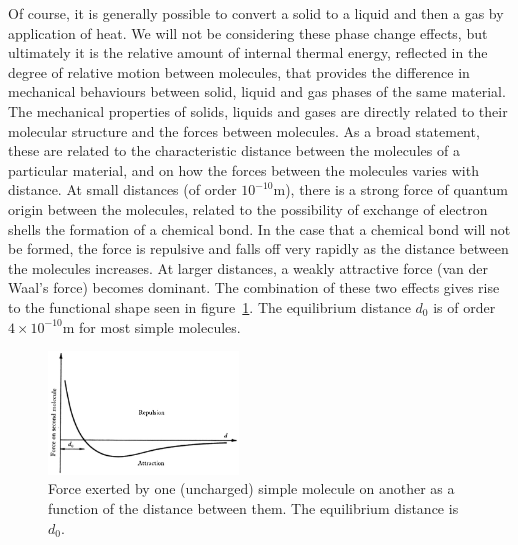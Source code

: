 \documentclass[twoside,11pt]		{report}
\begin{document}
Of course, it is generally possible to convert a solid to a liquid and
then a gas by application of heat. We will not be considering these
phase change effects, but ultimately it is the relative amount of
internal thermal energy, reflected in the degree of relative motion
between molecules, that provides the difference in mechanical
behaviours between solid, liquid and gas phases of the same
material. The mechanical properties of solids, liquids and gases are
directly related to their molecular structure and the forces between
molecules. As a broad statement, these are related to the
characteristic distance between the molecules of a particular
material, and on how the forces between the molecules varies with
distance. At small distances (of order $10^{-10}$m), there is a strong
force of quantum origin between the molecules, related to the
possibility of exchange of electron shells \ie the formation of a
chemical bond. In the case that a chemical bond will not be formed,
the force is repulsive and falls off very rapidly as the distance
between the molecules increases. At larger distances, a weakly
attractive force (van der Waal's force) becomes dominant. The
combination of these two effects gives rise to the functional shape
seen in figure~\ref{fig.lj}. The equilibrium distance $d_0$ is of
order $4\times10^{-10}$m for most simple molecules.

\begin{figure}
\begin{center}
\includegraphics[width=0.45\textwidth]{Bat-1.1.1.eps}
\end{center}
\caption{Force exerted by one (uncharged) simple molecule on another
  as a function of the distance between them. The equilibrium distance
  is $d_0$. \citep[From][]{bat67}}
\label{fig.lj}
\end{figure}
\end{document}
